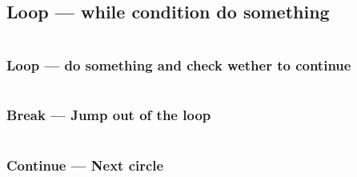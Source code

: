 \documentclass[
  11pt, %
  xcolor=dvipsnames
]{beamer}
\begin{document}
\subsection{Loop --- while condition do something}
\begin{frame}[fragile]

	\begin{columns}[c]
		\begin{column}{0.9\textwidth}


		\end{column}
	\end{columns}

\end{frame}

\subsubsection{Loop --- do something and check wether to continue}
\begin{frame}[fragile]

	\begin{columns}[c]
		\begin{column}{0.9\textwidth}


		\end{column}
	\end{columns}

\end{frame}

\subsubsection{Break --- Jump out of the loop}
\begin{frame}[fragile]

	\begin{columns}[c]
		\begin{column}{0.9\textwidth}


		\end{column}
	\end{columns}

\end{frame}

\subsubsection{Continue --- Next circle}
\begin{frame}[fragile]

	\begin{columns}[c]
		\begin{column}{0.9\textwidth}


		\end{column}
	\end{columns}

\end{frame}
\end{document}
